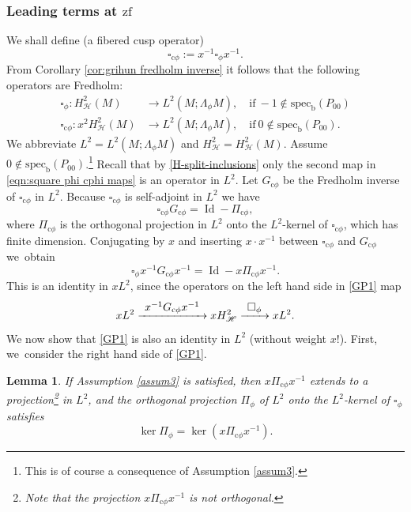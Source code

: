 \documentclass[11pt]{article}
\numberwithin{equation}{section}
\newcommand\To[1]{\mathchoice{\xrightarrow{\textstyle\kern4pt#1\kern3pt}}{\stackrel{#1}{\longrightarrow}}{}{}}
\newcommand{\cphi}{{\mathrm{c}\phi}}
\theoremstyle{plain}
\newtheorem{Lemma}[Th]{Lemma}
\theoremstyle{definition}
\newcommand{\bb}{{\mathrm{b}}}
\newcommand{\zf}{{\mathrm{zf}}}
\newcommand{\specb}{\mathrm{spec}_\bb}
\DeclareMathOperator{\Id}{Id}
\newcommand{\Hsplit}{H_{\mathscr{H}}}
\begin{document}
\subsubsection{Leading terms at $\zf$}
We shall define (a fibered cusp operator)
\[
\square_{\cphi} := x^{-1}\square_\phi x^{-1}.
\]
From Corollary \ref{cor:grihun fredholm inverse} it follows that the following operators are Fredholm:
\begin{equation}
\label{eqn:square phi cphi maps}
\begin{split}
\square_\phi:H^2_{\mathscr{H}}(M)
&\to L^2(M;\Lambda_\phi M), \quad \text{if} \ -1 \notin \specb(P_{00}) \\
\square_{\cphi}:x^2H^2_{\mathscr{H}}(M)
&\to L^2(M;\Lambda_\phi M), \quad \text{if} \ 0 \notin \specb(P_{00}).
\end{split}
\end{equation}
We abbreviate $L^2=L^2(M;\Lambda_\phi M)$ and $H^2_{\mathscr{H}} = H^2_{\mathscr{H}}(M)$.
Assume $0\not\in \specb(P_{00})$.\footnote{This is of course a consequence of Assumption \ref{assum3}.}
Recall that by \eqref{H-split-inclusions} only the
second map in \eqref{eqn:square phi cphi maps} is an operator in $L^2$. Let $G_{\cphi}$ be the Fredholm inverse of $\square_{\cphi}$ in $L^2$. Because $\square_{\cphi}$ is self-adjoint in $L^2$ we have
\begin{equation}\label{cphi-Fredholm}
\square_{\cphi}G_{\cphi} = \Id - \Pi_{\cphi},
\end{equation}
where $\Pi_{\cphi}$ is the orthogonal projection in $L^2$ onto the $L^2$-kernel of $\square_{\cphi}$, which has finite dimension.
Conjugating by $x$ and inserting $x\cdot x^{-1}$ between $\square_{\cphi}$ and $G_{\cphi} $ we~obtain
\begin{equation}\label{GP1}
\square_{\phi} x^{-1} G_{\cphi} x^{-1} = \Id - x \Pi_{\cphi} x^{-1}.
\end{equation}
This is an identity in $x L^2$, since the operators on the left hand side in \eqref{GP1} map
\[
xL^2 \To{x^{-1} G_{\cphi} x^{-1} } x \Hsplit^2 \To{\square_\phi} xL^2.
\]
We now show that \eqref{GP1} is also an identity in $L^2$ (without weight $x$!).
First, we~consider the right hand side of \eqref{GP1}.
\begin{Lemma} \label{lem:ker piphi}
If Assumption \ref{assum3} is satisfied, then $x\Pi_{\cphi}x^{-1}$ extends to a projection\footnote{Note that the projection $x\Pi_{\cphi}x^{-1}$ is not orthogonal.} in $L^2$, and the orthogonal
projection $\Pi_\phi$ of $L^2$ onto the $L^2$-kernel of $\square_{\phi}$ satisfies
\[
\ker \Pi_\phi = \ker \left(x \Pi_{\cphi} x^{-1} \right).
\]
\end{Lemma}
\end{document}
